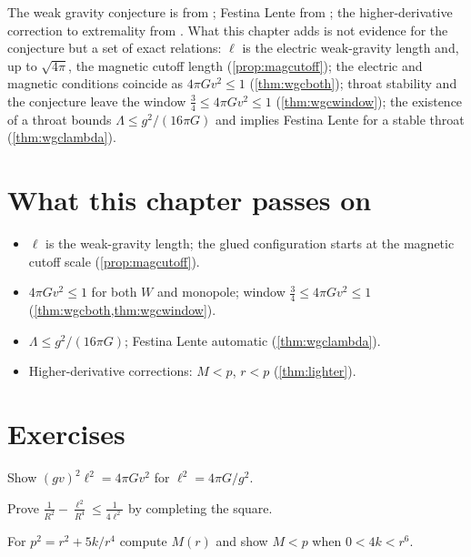 \begin{litbox}
The weak gravity conjecture is from \cite{AMNV2007}; Festina Lente from \cite{Montero2020}; the higher-derivative correction to extremality from \cite{KatsMotlPadi2007,CheungLiuRemmen2018}. What this chapter adds is not evidence for the conjecture but a set of exact relations: $\ell$ is the electric weak-gravity length and, up to $\sqrt{4\pi}$, the magnetic cutoff length (\cref{prop:magcutoff}); the electric and magnetic conditions coincide as $4\pi Gv^2\le1$ (\cref{thm:wgcboth}); throat stability and the conjecture leave the window $\frac34\le4\pi Gv^2\le1$ (\cref{thm:wgcwindow}); the existence of a throat bounds $\Lambda\le g^2/(16\pi G)$ and implies Festina Lente for a stable throat (\cref{thm:wgclambda}).
\end{litbox}

\section*{What this chapter passes on}
\begin{itemize}[nosep]
\item $\ell$ is the weak-gravity length; the glued configuration starts at the magnetic cutoff scale (\cref{prop:magcutoff}).
\item $4\pi Gv^2\le1$ for both $W$ and monopole; window $\frac34\le4\pi Gv^2\le1$ (\cref{thm:wgcboth,thm:wgcwindow}).
\item $\Lambda\le g^2/(16\pi G)$; Festina Lente automatic (\cref{thm:wgclambda}).
\item Higher-derivative corrections: $M<p$, $r<p$ (\cref{thm:lighter}).
\end{itemize}

\section*{Exercises}
\begin{exercise}
Show $(gv)^2\ell^2=4\pi Gv^2$ for $\ell^2=4\pi G/g^2$.
\end{exercise}
\begin{exercise}
Prove $\frac1{R^2}-\frac{\ell^2}{R^4}\le\frac1{4\ell^2}$ by completing the square.
\end{exercise}
\begin{exercise}
For $p^2=r^2+5k/r^4$ compute $M(r)$ and show $M<p$ when $0<4k<r^6$.
\end{exercise}

